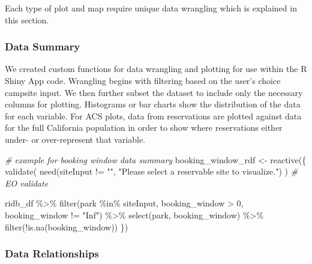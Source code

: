 \documentclass[
]{book}
\newenvironment{Shaded}{\begin{snugshade}}{\end{snugshade}}
\newcommand{\CommentTok}[1]{\textcolor[rgb]{0.56,0.35,0.01}{\textit{#1}}}
\newcommand{\DecValTok}[1]{\textcolor[rgb]{0.00,0.00,0.81}{#1}}
\newcommand{\FunctionTok}[1]{\textcolor[rgb]{0.00,0.00,0.00}{#1}}
\newcommand{\NormalTok}[1]{#1}
\newcommand{\OtherTok}[1]{\textcolor[rgb]{0.56,0.35,0.01}{#1}}
\newcommand{\SpecialCharTok}[1]{\textcolor[rgb]{0.00,0.00,0.00}{#1}}
\newcommand{\StringTok}[1]{\textcolor[rgb]{0.31,0.60,0.02}{#1}}
\begin{document}
Each type of plot and map require unique data wrangling which is explained in this section.

\hypertarget{data-summary}{%
\subsubsection{Data Summary}\label{data-summary}}

We created custom functions for data wrangling and plotting for use within the R Shiny App code. Wrangling begins with filtering based on the user's choice campsite input. We then further subset the dataset to include only the necessary columns for plotting. Histograms or bar charts show the distribution of the data for each variable. For ACS plots, data from reservations are plotted against data for the full California population in order to show where reservations either under- or over-represent that variable.

\begin{Shaded}
\begin{Highlighting}[]
\CommentTok{\# example for booking window data summary}
\NormalTok{booking\_window\_rdf }\OtherTok{\textless{}{-}} \FunctionTok{reactive}\NormalTok{(\{}
  \FunctionTok{validate}\NormalTok{(}
    \FunctionTok{need}\NormalTok{(siteInput }\SpecialCharTok{!=} \StringTok{""}\NormalTok{,}
         \StringTok{"Please select a reservable site to visualize."}\NormalTok{)}
\NormalTok{  ) }\CommentTok{\# EO validate}
  
\NormalTok{  ridb\_df }\SpecialCharTok{\%\textgreater{}\%}
    \FunctionTok{filter}\NormalTok{(park }\SpecialCharTok{\%in\%}\NormalTok{ siteInput,}
\NormalTok{           booking\_window }\SpecialCharTok{\textgreater{}} \DecValTok{0}\NormalTok{,}
\NormalTok{           booking\_window }\SpecialCharTok{!=} \StringTok{"Inf"}\NormalTok{) }\SpecialCharTok{\%\textgreater{}\%} 
    \FunctionTok{select}\NormalTok{(park, booking\_window) }\SpecialCharTok{\%\textgreater{}\%} 
    \FunctionTok{filter}\NormalTok{(}\SpecialCharTok{!}\FunctionTok{is.na}\NormalTok{(booking\_window))}
\NormalTok{\})}
\end{Highlighting}
\end{Shaded}

\hypertarget{data-relationships}{%
\subsubsection{Data Relationships}\label{data-relationships}}
\end{document}
